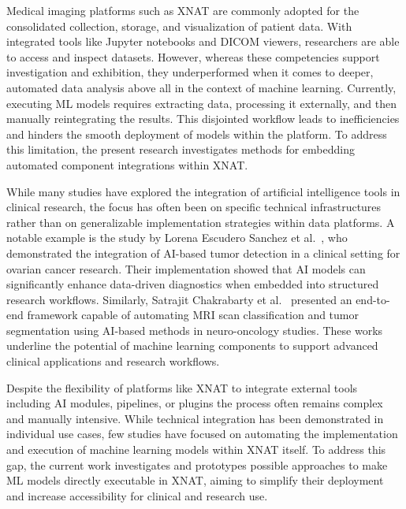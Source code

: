 Medical imaging platforms such as XNAT are commonly adopted for the consolidated collection, storage, and visualization of patient data. With integrated tools like Jupyter notebooks and \ac{DICOM} viewers, researchers are able to access and inspect datasets. However, whereas these competencies support investigation and exhibition, they underperformed when it comes to deeper, automated data analysis above all in the context of machine learning. Currently, executing ML models requires extracting data, processing it externally, and then manually reintegrating the results. This disjointed workflow leads to inefficiencies and hinders the smooth deployment of models within the platform. To address this limitation, the present research investigates methods for embedding automated component integrations within XNAT.


While many studies have explored the integration of artificial intelligence tools in clinical research, the focus has often been on specific technical infrastructures rather than on generalizable implementation strategies within data platforms. A notable example is the study by Lorena Escudero Sanchez et al.~\cite{escudero_sanchez_integrating_2023}, who demonstrated the integration of AI-based tumor detection in a clinical setting for ovarian cancer research. Their implementation showed that AI models can significantly enhance data-driven diagnostics when embedded into structured research workflows. Similarly, Satrajit Chakrabarty et al.~\cite{chakrabarty_deep_2023} presented an end-to-end framework capable of automating \ac{MRI} scan classification and tumor segmentation using AI-based methods in neuro-oncology studies. These works underline the potential of machine learning components to support advanced clinical applications and research workflows.

Despite the flexibility of platforms like XNAT to integrate external tools including AI modules, pipelines, or plugins the process often remains complex and manually intensive. While technical integration has been demonstrated in individual use cases, few studies have focused on automating the implementation and execution of machine learning models within XNAT itself. To address this gap, the current work investigates and prototypes possible approaches to make \ac{ML} models directly executable in XNAT, aiming to simplify their deployment and increase accessibility for clinical and research use.
















 

